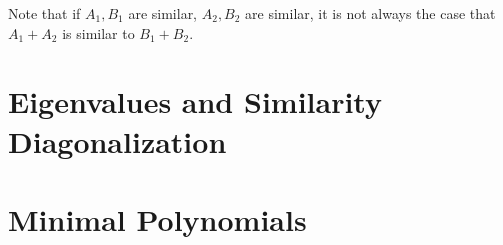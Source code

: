 \begin{note}
  Note that if $A_1, B_1$ are similar, $A_2, B_2$ are similar,
  it is not always the case that $A_1 + A_2$ is similar to $B_1 + B_2$.
\end{note}


\section{Eigenvalues and Similarity Diagonalization}

\section{Minimal Polynomials}



